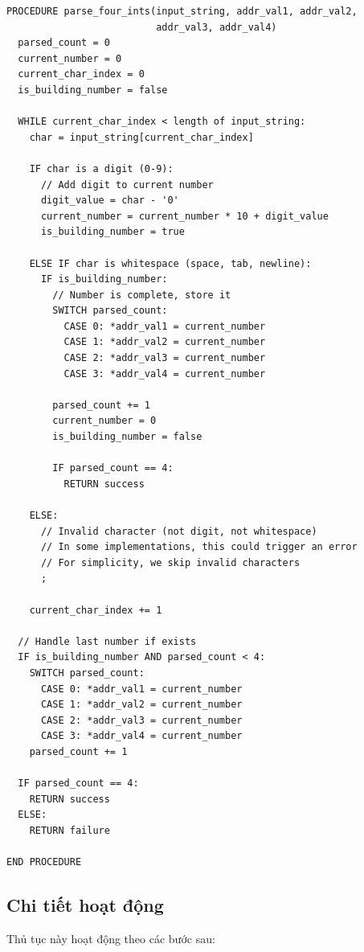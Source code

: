 \begin{verbatim}
PROCEDURE parse_four_ints(input_string, addr_val1, addr_val2, 
                          addr_val3, addr_val4)
  parsed_count = 0
  current_number = 0
  current_char_index = 0
  is_building_number = false
  
  WHILE current_char_index < length of input_string:
    char = input_string[current_char_index]
    
    IF char is a digit (0-9):
      // Add digit to current number
      digit_value = char - '0'
      current_number = current_number * 10 + digit_value
      is_building_number = true
    
    ELSE IF char is whitespace (space, tab, newline):
      IF is_building_number:
        // Number is complete, store it
        SWITCH parsed_count:
          CASE 0: *addr_val1 = current_number
          CASE 1: *addr_val2 = current_number
          CASE 2: *addr_val3 = current_number
          CASE 3: *addr_val4 = current_number
        
        parsed_count += 1
        current_number = 0
        is_building_number = false
        
        IF parsed_count == 4:
          RETURN success
    
    ELSE:
      // Invalid character (not digit, not whitespace)
      // In some implementations, this could trigger an error
      // For simplicity, we skip invalid characters
      ;
    
    current_char_index += 1
  
  // Handle last number if exists
  IF is_building_number AND parsed_count < 4:
    SWITCH parsed_count:
      CASE 0: *addr_val1 = current_number
      CASE 1: *addr_val2 = current_number
      CASE 2: *addr_val3 = current_number
      CASE 3: *addr_val4 = current_number
    parsed_count += 1
  
  IF parsed_count == 4:
    RETURN success
  ELSE:
    RETURN failure

END PROCEDURE
\end{verbatim}

\subsection{Chi tiết hoạt động}

Thủ tục này hoạt động theo các bước sau:

